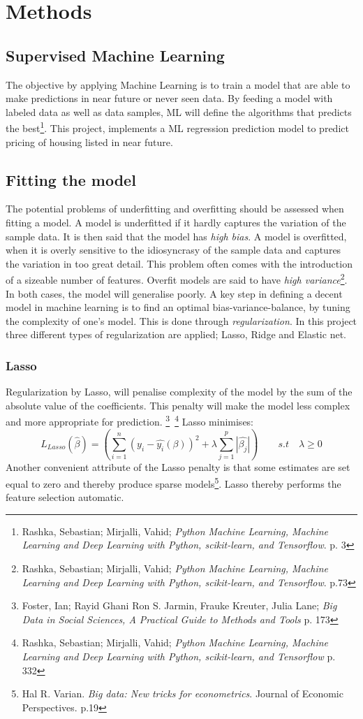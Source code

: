 \documentclass[12pt,a4paper]{article}
\begin{document}
\section{Methods}
\subsection{Supervised Machine Learning}
The objective by applying Machine Learning is to train a model that are able to make predictions in near future or never seen data. By feeding a model with labeled data as well as data samples, ML will define the algorithms that predicts the best\footnote{Rashka, Sebastian; Mirjalli, Vahid; \textit{Python Machine Learning, Machine Learning and Deep Learning with Python, scikit-learn, and Tensorflow}. p. 3}.   This project, implements a ML regression prediction model to predict pricing of housing listed in near future.
\subsection{Fitting the model}
The potential problems of underfitting and overfitting should be assessed when fitting a model. A model is underfitted if it hardly captures the variation of the sample data. It is then said that the model has \textit{high bias}. A model is overfitted, when it is overly sensitive to the idiosyncrasy of the sample data and captures the variation in too great detail. This problem often comes with the introduction of a sizeable number of features. Overfit models are said to have \textit{high variance}\footnote{Rashka, Sebastian; Mirjalli, Vahid; \textit{Python Machine Learning, Machine Learning and Deep Learning with Python, scikit-learn, and Tensorflow}. p.73}. In both cases, the model will generalise poorly. A key step in defining a decent model in machine learning is to find an optimal bias-variance-balance, by tuning the complexity of one’s model. This is done through \textit{regularization}. In this project three different types of regularization are applied; Lasso, Ridge and Elastic net.   

\subsubsection{Lasso}
Regularization by Lasso, will penalise complexity of the model by the sum of the absolute value of the coefficients. This penalty will make the model less complex and more appropriate for prediction.  \footnote{Foster, Ian; Rayid Ghani Ron S. Jarmin, Frauke Kreuter, Julia Lane; \textit{Big Data in Social Sciences, A Practical Guide to Methods and Tools} p. 173}\, \footnote{Rashka, Sebastian; Mirjalli, Vahid; \textit{Python Machine Learning, Machine Learning and Deep Learning with Python, scikit-learn, and Tensorflow} p. 332}
\newline Lasso minimises: $$L_{Lasso}(\hat{\beta}) = \left(\sum_{i=1}^{n} (y_i-\hat{y_i}(\beta))^2+\lambda\sum_{j=1}^{p}|\hat{\beta_j}|\right) \qquad s.t \quad \lambda \geq 0 $$
Another convenient attribute of the Lasso penalty is that some estimates are set equal to zero and thereby produce sparse models\footnote{Hal R. Varian. \textit{Big data: New tricks for econometrics}. Journal of Economic Perspectives. p.19}. Lasso thereby performs the feature selection automatic.   
\end{document}
